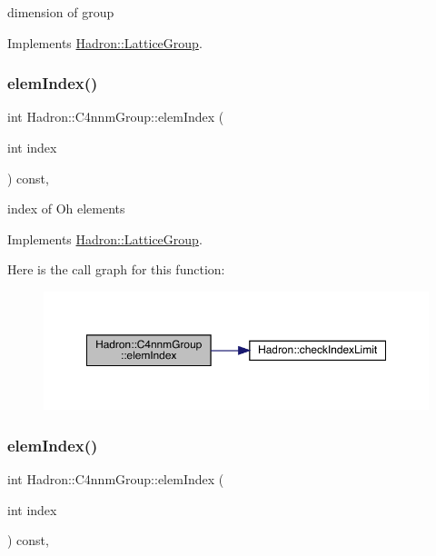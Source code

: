 dimension of group 

Implements \mbox{\hyperlink{structHadron_1_1LatticeGroup_abd8415698323796ef6a8605796ee3bea}{Hadron\+::\+Lattice\+Group}}.

\mbox{\label{structHadron_1_1C4nnmGroup_a8cbcb161ddf801e759797f231db35f75}} 
\subsubsection{\texorpdfstring{elemIndex()}{elemIndex()}\hspace{0.1cm}{\footnotesize\ttfamily [1/3]}}
{\footnotesize\ttfamily int Hadron\+::\+C4nnm\+Group\+::elem\+Index (\begin{DoxyParamCaption}\item[{int}]{index }\end{DoxyParamCaption}) const\hspace{0.3cm}{\ttfamily [inline]}, {\ttfamily [virtual]}}

index of Oh elements 

Implements \mbox{\hyperlink{structHadron_1_1LatticeGroup_afb8e3ee60de059f75bce1044c694e1e8}{Hadron\+::\+Lattice\+Group}}.

Here is the call graph for this function\+:
\nopagebreak
\begin{figure}[H]
\begin{center}
\leavevmode
\includegraphics[width=350pt]{d1/dba/structHadron_1_1C4nnmGroup_a8cbcb161ddf801e759797f231db35f75_cgraph}
\end{center}
\end{figure}
\mbox{\label{structHadron_1_1C4nnmGroup_a8cbcb161ddf801e759797f231db35f75}} 
\subsubsection{\texorpdfstring{elemIndex()}{elemIndex()}\hspace{0.1cm}{\footnotesize\ttfamily [2/3]}}
{\footnotesize\ttfamily int Hadron\+::\+C4nnm\+Group\+::elem\+Index (\begin{DoxyParamCaption}\item[{int}]{index }\end{DoxyParamCaption}) const\hspace{0.3cm}{\ttfamily [inline]}, {\ttfamily [virtual]}}

